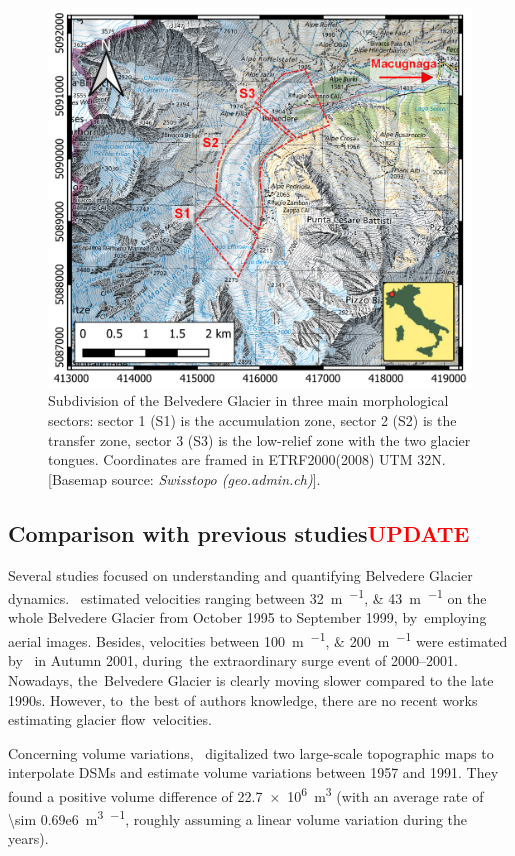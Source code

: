 \begin{figure}
    \centering
    \includegraphics[width=.7\textwidth]{belvedereMapSect}
	\caption{Subdivision of the Belvedere Glacier in three main morphological sectors: sector 1 (S1) is the accumulation zone, sector 2 (S2) is the transfer zone, sector 3 (S3) is the low-relief zone with the two glacier tongues. Coordinates are framed in ETRF2000(2008) UTM 32N. [Basemap source: \textit{Swisstopo (geo.admin.ch)}].}
	\label{fig:3:sectors}	
\end{figure}	

\subsection{Comparison with previous studies\textcolor{red}{UPDATE}}\label{sec:3:discussion:prevstudies}

Several studies focused on understanding and quantifying Belvedere Glacier
dynamics.~\cite{Kaab2005} estimated velocities ranging between
\SIlist{32;43}{\meter\per\year} on the whole Belvedere Glacier from October 1995 to
September 1999, by~employing aerial images.
Besides, velocities between \SIlist{100;200}{\meter\per\year} were estimated
by~\cite{Kaab2005} in Autumn 2001, during~the extraordinary surge event of 2000--2001.
Nowadays, the~Belvedere Glacier is clearly moving slower compared to the late 1990s.
However, to~the best of authors knowledge, there are no recent works estimating glacier
flow~velocities.

Concerning volume variations,~\cite{Diolaiuti2003} digitalized two large-scale
topographic maps to interpolate DSMs and estimate volume variations between 1957 and
1991.
They found a positive volume difference of
\SI[retain-explicit-plus]{+22.7e6}{\cubic\meter} (with an average rate of \SI{\sim
    0.69e6}{\cubic\m\per\year}, roughly assuming a linear volume variation during the
years).

